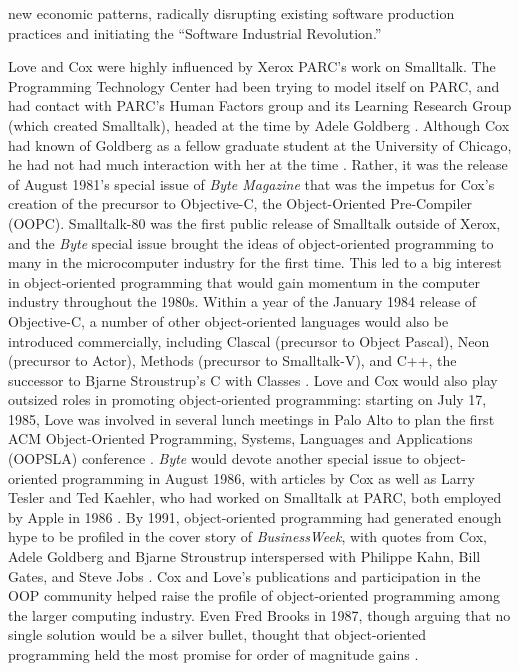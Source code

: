 \documentclass[acmsmall,screen]{acmart}
\begin{document}
new economic patterns, radically disrupting existing software production practices and initiating the ``Software Industrial Revolution.'' \citep[209--14]{cox_there_1990}

Love and Cox were highly influenced by Xerox PARC's work on Smalltalk. The Programming Technology Center had been trying to model itself on PARC, and had contact with PARC's Human Factors group and its Learning Research Group (which created Smalltalk), headed at the time by Adele Goldberg . Although Cox had known of Goldberg as a fellow graduate student at the University of Chicago, he had not had much interaction with her at the time \citep[9--10]{cox_oral_2016}. Rather, it was the release of August 1981's special issue of \emph{Byte Magazine} \citep{xerox_learning_research_group_smalltalk-80_1981} that was the impetus for Cox's creation of the precursor to Objective-C, the Object-Oriented Pre-Compiler (OOPC). Smalltalk-80 was the first public release of Smalltalk outside of Xerox, and the \emph{Byte} special issue brought the ideas of object-oriented programming to many in the microcomputer industry for the first time. This led to a big interest in object-oriented programming that would gain momentum in the computer industry throughout the 1980s. Within a year of the January 1984 release of Objective-C, a number of other object-oriented languages would also be introduced commercially, including Clascal (precursor to Object Pascal), Neon (precursor to Actor), Methods (precursor to Smalltalk-V), and C++, the successor to Bjarne Stroustrup's C with Classes \citep[41]{love_object_1995}. Love and Cox would also play outsized roles in promoting object-oriented programming: starting on July 17, 1985, Love was involved in several lunch meetings in Palo Alto to plan the first ACM Object-Oriented Programming, Systems, Languages and Applications (OOPSLA) conference \citetext{\citealp[24]{love_object_1995}; }. \emph{Byte} would devote another special issue to object-oriented programming in August 1986, with articles by Cox as well as Larry Tesler and Ted Kaehler, who had worked on Smalltalk at PARC, both employed by Apple in 1986 \citep{cox_objects_1986,kaehler_small_1986,tesler_programming_1986}. By 1991, object-oriented programming had generated enough hype to be profiled in the cover story of \emph{BusinessWeek}, with quotes from Cox, Adele Goldberg and Bjarne Stroustrup interspersed with Philippe Kahn, Bill Gates, and Steve Jobs \citep{verity_software_1991}. Cox and Love's publications and participation in the OOP community helped raise the profile of object-oriented programming among the larger computing industry. Even Fred Brooks in 1987, though arguing that no single solution would be a silver bullet, thought that object-oriented programming held the most promise for order of magnitude gains \citep[14]{brooks_no_1987}.
\end{document}
